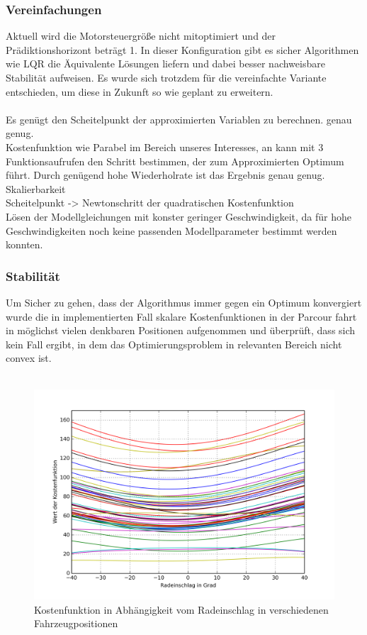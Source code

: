 \subsubsection{Vereinfachungen}
Aktuell wird die Motorsteuergröße nicht mitoptimiert und der Prädiktionshorizont beträgt 1. In dieser Konfiguration gibt es sicher Algorithmen wie LQR die Äquivalente Lösungen liefern und dabei besser nachweisbare Stabilität aufweisen. Es wurde sich trotzdem für die vereinfachte Variante entschieden, um diese in Zukunft so wie geplant zu erweitern.\\ \\
Es genügt den Scheitelpunkt der approximierten Variablen zu berechnen. genau genug.\\
Kostenfunktion wie Parabel im Bereich unseres Interesses, an kann mit 3 Funktionsaufrufen den Schritt bestimmen, der zum Approximierten Optimum führt. Durch genügend hohe Wiederholrate ist das Ergebnis genau genug.
Skalierbarkeit\\
Scheitelpunkt -> Newtonschritt der quadratischen Kostenfunktion\\

Lösen der Modellgleichungen mit konster geringer Geschwindigkeit, da für hohe Geschwindigkeiten noch keine passenden Modellparameter bestimmt werden konnten.
\subsubsection{Stabilität}
Um Sicher zu gehen, dass der Algorithmus immer gegen ein Optimum konvergiert wurde die in implementierten Fall skalare Kostenfunktionen in der Parcour fahrt in möglichst vielen denkbaren Positionen aufgenommen und überprüft, dass sich kein Fall ergibt, in dem das Optimierungsproblem in relevanten Bereich nicht convex ist.
\\
\\
\begin{figure}[t]
\centering
\includegraphics[scale=0.75]{Bilder/Parabeln.png}
\caption{Kostenfunktion in Abhängigkeit vom Radeinschlag in verschiedenen Fahrzeugpositionen}
\end{figure}

